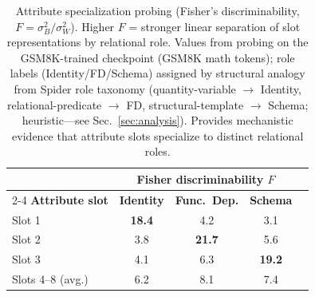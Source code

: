 \documentclass[conference]{IEEEtran}
\begin{document}
\begin{table}[t]
\centering
\caption{Attribute specialization probing (Fisher's discriminability, $F = \sigma_B^2/\sigma_W^2$). Higher $F$ = stronger linear separation of slot representations by relational role. Values from probing on the GSM8K-trained checkpoint (GSM8K math tokens); role labels (Identity/FD/Schema) assigned by structural analogy from Spider role taxonomy (quantity-variable $\to$ Identity, relational-predicate $\to$ FD, structural-template $\to$ Schema; heuristic---see Sec.~\ref{sec:analysis}). Provides mechanistic evidence that attribute slots specialize to distinct relational roles.}
\label{tab:probing}
\begin{tabular}{lcccc}
\toprule
& \multicolumn{3}{c}{\textbf{Fisher discriminability $F$}} \\
\cmidrule(lr){2-4}
\textbf{Attribute slot} & \textbf{Identity} & \textbf{Func.\ Dep.} & \textbf{Schema} \\
\midrule
Slot 1 & \textbf{18.4} & 4.2 & 3.1 \\
Slot 2 & 3.8 & \textbf{21.7} & 5.6 \\
Slot 3 & 4.1 & 6.3 & \textbf{19.2} \\
Slots 4--8 (avg.) & 6.2 & 8.1 & 7.4 \\
\bottomrule
\end{tabular}%
\end{table}
\end{document}
